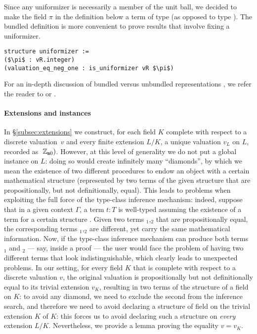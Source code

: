 \documentclass[sigplan,10pt, nonacm, review]{acmart}
\begin{document}
Since any uniformizer is necessarily a member of the unit ball, we decided to make the field $\pi$ in the definition below a term of type  (as opposed to type ). The bundled definition is more convenient to prove results that involve fixing a uniformizer.
\begin{lstlisting}
structure uniformizer :=
($\pi$ : vR.integer)
(valuation_eq_neg_one : is_uniformizer vR $\pi$)
\end{lstlisting}

For an in-depth discussion of bundled versus unbundled representations , we refer the reader to \cite{Baa22} or \cite{typeclassesCoq}.

\paragraph{Extensions and  instances}
In \S\ref{subsec:extensions} we construct, for each field $K$ complete with respect to a discrete valuation~$v$ and every finite extension $L/K$, a unique valuation $v_L$ on $L$, recorded as $\;\mathbb{Z}_{\mathtt{m}0})$. However, at this level of generality we do not put a global  instance on $L$: doing so would create infinitely many ``diamonds'', by which we mean the existence of two different procedures to endow an object with a certain mathematical structure (represented by two terms of the given structure that are propositionally, but not definitionally, equal). This leads to problems when exploiting the full force of the type-class inference mechanism: indeed, suppose that in a given context $\Gamma$, a term $t:T$ is well-typed assuming the existence of a term  for a certain structure . Given two terms $_1$,$_2$ that are propositionally equal, the corresponding terms $_1$,$_2$ are different, yet carry the same mathematical information. Now, if the type-class inference mechanism can produce both terms $_1$ and $_2$ --- say, inside a proof --- the user would face the problem of having two different terms that look indistinguishable, which clearly leads to unexpected problems. In our setting, for every field $K$ that is complete with respect to a discrete valuation $v$, the original valuation is propositionally but not definitionally equal to its trivial extension $v_K$, resulting in two terms of the structure of a  field on $K$: to avoid any diamond, we need to exclude the second from the inference search, and therefore we need to avoid declaring a structure of  field on the trivial extension $K$ of $K$: this forces us to avoid declaring such a structure on \emph{every} extension $L/K$. Nevertheless, we provide a lemma \href{https://github.com/LCFT-Lean/local_fields/blob/76ad487d09babdb0018f394a5634526637ee014a/src/discrete_valuation_ring/trivial_extension.lean#L58}{\extlink} proving the equality $v=v_K$.
\end{document}
